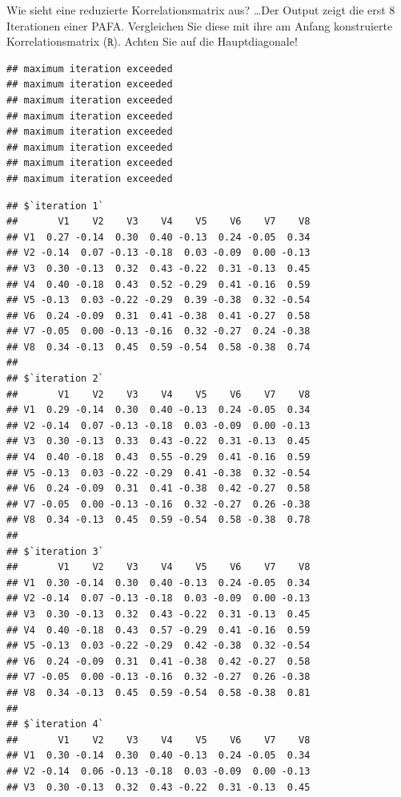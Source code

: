 \documentclass[
  ignorenonframetext,
]{beamer}
\begin{document}
\begin{frame}[fragile]{Wie sieht eine reduzierte Korrelationsmatrix
aus?}
\protect\hypertarget{wie-sieht-eine-reduzierte-korrelationsmatrix-aus}{}
\ldots Der Output zeigt die erst 8 Iterationen einer PAFA. Vergleichen
Sie diese mit ihre am Anfang konstruierte Korrelationsmatrix
(\(\texttt{R}\)). Achten Sie auf die Hauptdiagonale!

\begin{verbatim}
## maximum iteration exceeded
## maximum iteration exceeded
## maximum iteration exceeded
## maximum iteration exceeded
## maximum iteration exceeded
## maximum iteration exceeded
## maximum iteration exceeded
## maximum iteration exceeded
\end{verbatim}

\begin{verbatim}
## $`iteration 1`
##       V1    V2    V3    V4    V5    V6    V7    V8
## V1  0.27 -0.14  0.30  0.40 -0.13  0.24 -0.05  0.34
## V2 -0.14  0.07 -0.13 -0.18  0.03 -0.09  0.00 -0.13
## V3  0.30 -0.13  0.32  0.43 -0.22  0.31 -0.13  0.45
## V4  0.40 -0.18  0.43  0.52 -0.29  0.41 -0.16  0.59
## V5 -0.13  0.03 -0.22 -0.29  0.39 -0.38  0.32 -0.54
## V6  0.24 -0.09  0.31  0.41 -0.38  0.41 -0.27  0.58
## V7 -0.05  0.00 -0.13 -0.16  0.32 -0.27  0.24 -0.38
## V8  0.34 -0.13  0.45  0.59 -0.54  0.58 -0.38  0.74
## 
## $`iteration 2`
##       V1    V2    V3    V4    V5    V6    V7    V8
## V1  0.29 -0.14  0.30  0.40 -0.13  0.24 -0.05  0.34
## V2 -0.14  0.07 -0.13 -0.18  0.03 -0.09  0.00 -0.13
## V3  0.30 -0.13  0.33  0.43 -0.22  0.31 -0.13  0.45
## V4  0.40 -0.18  0.43  0.55 -0.29  0.41 -0.16  0.59
## V5 -0.13  0.03 -0.22 -0.29  0.41 -0.38  0.32 -0.54
## V6  0.24 -0.09  0.31  0.41 -0.38  0.42 -0.27  0.58
## V7 -0.05  0.00 -0.13 -0.16  0.32 -0.27  0.26 -0.38
## V8  0.34 -0.13  0.45  0.59 -0.54  0.58 -0.38  0.78
## 
## $`iteration 3`
##       V1    V2    V3    V4    V5    V6    V7    V8
## V1  0.30 -0.14  0.30  0.40 -0.13  0.24 -0.05  0.34
## V2 -0.14  0.07 -0.13 -0.18  0.03 -0.09  0.00 -0.13
## V3  0.30 -0.13  0.32  0.43 -0.22  0.31 -0.13  0.45
## V4  0.40 -0.18  0.43  0.57 -0.29  0.41 -0.16  0.59
## V5 -0.13  0.03 -0.22 -0.29  0.42 -0.38  0.32 -0.54
## V6  0.24 -0.09  0.31  0.41 -0.38  0.42 -0.27  0.58
## V7 -0.05  0.00 -0.13 -0.16  0.32 -0.27  0.26 -0.38
## V8  0.34 -0.13  0.45  0.59 -0.54  0.58 -0.38  0.81
## 
## $`iteration 4`
##       V1    V2    V3    V4    V5    V6    V7    V8
## V1  0.30 -0.14  0.30  0.40 -0.13  0.24 -0.05  0.34
## V2 -0.14  0.06 -0.13 -0.18  0.03 -0.09  0.00 -0.13
## V3  0.30 -0.13  0.32  0.43 -0.22  0.31 -0.13  0.45

\end{verbatim}
\end{frame}
\end{document}
